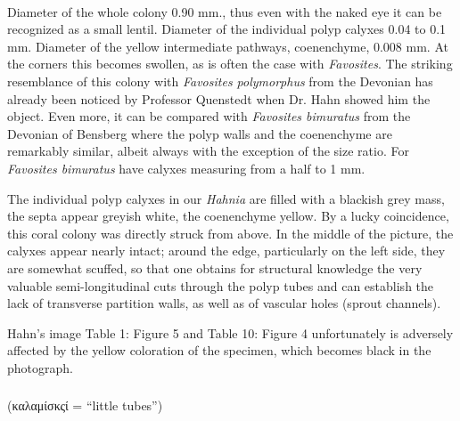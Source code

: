 \documentclass[a4paper, 12pt, oneside]{article}
\begin{document}
\paragraph*{}
Diameter of the whole colony 0.90 mm., thus even with the naked eye it can be recognized as a small lentil. Diameter of the individual polyp calyxes 0.04 to 0.1 mm. Diameter of the yellow intermediate pathways, coenenchyme, 0.008 mm. At the corners this becomes swollen, as is often the case with \emph{Favosites}. The striking resemblance of this colony with \emph{Favosites polymorphus} from the Devonian has already been noticed by Professor Quenstedt when Dr. Hahn showed him the object. Even more, it can be compared with \emph{Favosites bimuratus} from the Devonian of Bensberg where the polyp walls and the coenenchyme are remarkably similar, albeit always with the exception of the size ratio. For \emph{Favosites bimuratus} have calyxes measuring from a half to 1 mm.

The individual polyp calyxes in our \emph{Hahnia} are filled with a blackish grey mass, the septa appear greyish white, the coenenchyme yellow. By a lucky coincidence, this coral colony was directly struck from above. In the middle of the picture, the calyxes appear nearly intact; around the edge, particularly on the left side, they are somewhat scuffed, so that one obtains for structural knowledge the very valuable semi-longitudinal cuts through the polyp tubes and can establish the lack of transverse partition walls, as well as of vascular holes (sprout channels).

Hahn's image Table 1: Figure 5 and Table 10: Figure 4 unfortunately is adversely affected by the yellow coloration of the specimen, which becomes black in the photograph.
\subsubsection{}
\paragraph*{}
(καλαμίσκςί = ``little tubes'')%
\end{document}
